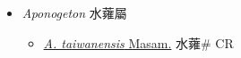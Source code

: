 
  \begin{itemize}
 \item[] \textit{Aponogeton} 水蕹屬
                    
  \begin{itemize}
        \item[] \href{http://www.theplantlist.org/tpl1.1/search?q=Aponogeton+taiwanensis}{\textit{A. taiwanensis} Masam.}   水蕹\# CR
  \end{itemize}
  \end{itemize}
